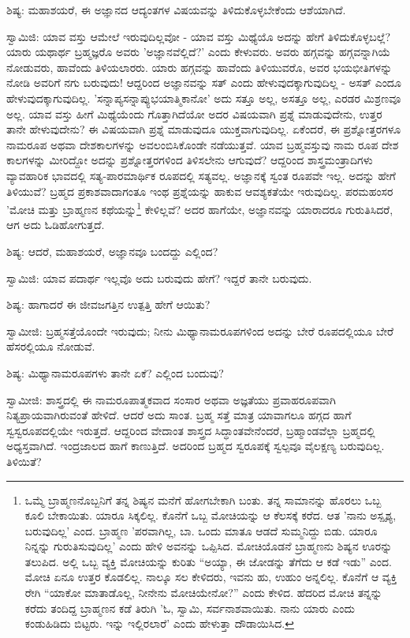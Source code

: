 ಶಿಷ್ಯ: ಮಹಾಶಯರೆ, ಈ ಅಜ್ಞಾನದ ಆದ್ಯಂತಗಳ ವಿಷಯವನ್ನು ತಿಳಿದುಕೊಳ್ಳಬೇಕೆಂದು ಆಶೆಯಾಗಿದೆ.

ಸ್ವಾಮಿಜಿ: ಯಾವ ವಸ್ತು ಆಮೇಲೆ ಇರುವುದಿಲ್ಲವೋ - ಯಾವ ವಸ್ತು ಮಿಥ್ಯೆಯೊ ಅದನ್ನು ಹೇಗೆ ತಿಳಿದುಕೊಳ್ಳಬಲ್ಲೆ? ಯಾರು ಯಥಾರ್ಥ ಬ್ರಹ್ಮಜ್ಞರೊ ಅವರು 'ಅಜ್ಞಾನವೆಲ್ಲಿದೆ?' ಎಂದು ಕೇಳುವರು. ಅವರು ಹಗ್ಗವನ್ನು ಹಗ್ಗವನ್ನಾಗಿಯೆ ನೋಡುವರು, ಹಾವೆಂದು ತಿಳಿಯಲಾರರು. ಯಾರು ಹಗ್ಗವನ್ನು ಹಾವೆಂದು ತಿಳಿಯುವರೊ, ಅವರ ಭಯಭೀತಿಗಳನ್ನು ನೋಡಿ ಅವರಿಗೆ ನಗು ಬರುವುದು! ಆದ್ದರಿಂದ ಅಜ್ಞಾನವನ್ನು ಸತ್ ಎಂದು ಹೇಳುವುದಕ್ಕಾಗುವುದಿಲ್ಲ - ಅಸತ್ ಎಂದೂ ಹೇಳುವುದಕ್ಕಾಗುವುದಿಲ್ಲ. 'ಸನ್ನಾಪ್ಯಸನ್ನಾಪ್ಯುಭಯಾತ್ಮಿಕಾನೋ' ಅದು ಸತ್ತೂ ಅಲ್ಲ, ಅಸತ್ತೂ ಅಲ್ಲ, ಎರಡರ ಮಿಶ್ರಣವೂ ಅಲ್ಲ. ಯಾವ ವಸ್ತು ಹೀಗೆ ಮಿಥ್ಯೆಯೆಂದು ಗೊತ್ತಾಗಿದೆಯೋ ಅದರ ವಿಷಯವಾಗಿ ಪ್ರಶ್ನೆ ಮಾಡುವುದೇನು, ಉತ್ತರ ತಾನೇ ಹೇಳುವುದೇನು? ಈ ವಿಷಯವಾಗಿ ಪ್ರಶ್ನೆ ಮಾಡುವುದೂ ಯುಕ್ತವಾಗುವುದಿಲ್ಲ. ಏಕೆಂದರೆ, ಈ ಪ್ರಶ್ನೋತ್ತರಗಳೂ ನಾಮರೂಪ ಅಥವಾ ದೇಶಕಾಲಗಳನ್ನು ಅವಲಂಬಿಸಿಕೊಂಡೇ ನಡೆಯುತ್ತವೆ. ಯಾವ ಬ್ರಹ್ಮವಸ್ತುವು ನಾಮ ರೂಪ ದೇಶ ಕಾಲಗಳನ್ನು ಮೀರಿದ್ದೋ ಅದನ್ನು ಪ್ರಶ್ನೋತ್ತರಗಳಿಂದ ತಿಳಿಸಲೇನು ಆಗುವುದೆ? ಆದ್ದರಿಂದ ಶಾಸ್ತ್ರಮಂತ್ರಾದಿಗಳು ವ್ಯಾವಹಾರಿಕ ಭಾವದಲ್ಲಿ ಸತ್ಯ-ಪಾರಮಾರ್ಥಿಕ ರೂಪದಲ್ಲಿ ಸತ್ಯವಲ್ಲ. ಅಜ್ಞಾನಕ್ಕೆ ಸ್ವಂತ ರೂಪವೇ ಇಲ್ಲ. ಅದನ್ನು ಹೇಗೆ ತಿಳಿಯುವೆ? ಬ್ರಹ್ಮದ ಪ್ರಕಾಶವಾದಾಗಂತೂ ಇಂಥ ಪ್ರಶ್ನೆಯನ್ನು ಹಾಕುವ ಆವಶ್ಯಕತೆಯೇ ಇರುವುದಿಲ್ಲ. ಪರಮಹಂಸರ 'ಮೋಚಿ ಮತ್ತು ಬ್ರಾಹ್ಮಣನ ಕಥೆಯನ್ನು\footnote{ಒಮ್ಮೆ ಬ್ರಾಹ್ಮಣನೊಬ್ಬನಿಗೆ ತನ್ನ ಶಿಷ್ಯನ ಮನೆಗೆ ಹೋಗಬೇಕಾಗಿ ಬಂತು. ತನ್ನ ಸಾಮಾನನ್ನು ಹೊರಲು ಒಬ್ಬ ಕೂಲಿ ಬೇಕಾಯಿತು. ಯಾರೂ ಸಿಕ್ಕಲಿಲ್ಲ. ಕೊನೆಗೆ ಒಬ್ಬ ಮೋಚಿಯನ್ನು ಆ ಕೆಲಸಕ್ಕೆ ಕರೆದ. ಆತ 'ನಾನು ಅಸ್ಪೃಶ್ಯ, ಬರುವುದಿಲ್ಲ' ಎಂದ. ಬ್ರಾಹ್ಮಣ 'ಪರವಾಗಿಲ್ಲ, ಬಾ. ಒಂದು ಮಾತೂ ಆಡದೆ ಸುಮ್ಮನಿದ್ದು ಬಿಡು. ಯಾರೂ ನಿನ್ನನ್ನು ಗುರುತಿಸುವುದಿಲ್ಲ' ಎಂದು ಹೇಳಿ ಅವನನ್ನು ಒಪ್ಪಿಸಿದ. ಮೋಚಿಯೊಡನೆ ಬ್ರಾಹ್ಮಣನು ಶಿಷ್ಯನ ಊರನ್ನು ತಲುಪಿದ. ಅಲ್ಲಿ ಒಬ್ಬ ವ್ಯಕ್ತಿ ಮೋಚಿಯನ್ನು ಕುರಿತು “ಅಯ್ಯಾ, ಈ ಜೋಡನ್ನು ತೆಗೆದು ಆ ಕಡೆ ಇಡು” ಎಂದ. ಮೋಚಿ ಏನೂ ಉತ್ತರ ಕೊಡಲಿಲ್ಲ. ನಾಲ್ಕೂ ಸಲ ಕೇಳಿದರು, ಇವನು ಹು, ಉಹುಂ ಅನ್ನಲಿಲ್ಲ. ಕೊನೆಗೆ ಆ ವ್ಯಕ್ತಿ ರೇಗಿ “ಯಾಕೋ ಮಾತಾಡೊಲ್ಲ, ನೀನೇನು ಮೋಚಿಯೇನೋ?” ಎಂದು ಕೇಳಿದ. ಹೆದರಿದ ಮೋಚಿ ತನ್ನನ್ನು ಕರೆದು ತಂದಿದ್ದ ಬ್ರಾಹ್ಮಣನ ಕಡೆ ತಿರುಗಿ 'ಓ, ಸ್ವಾಮಿ, ಸರ್ವನಾಶವಾಯಿತು. ನಾನು ಯಾರು ಎಂದು ಕಂಡುಹಿಡಿದು ಬಿಟ್ಟರು. ಇನ್ನು ಇಲ್ಲಿರಲಾರೆ' ಎಂದು ಹೇಳುತ್ತಾ ದೌಡಾಯಿಸಿದ.} ಕೇಳಿಲ್ಲವೆ? ಅದರ ಹಾಗೆಯೇ, ಅಜ್ಞಾನವನ್ನು ಯಾರಾದರೂ ಗುರುತಿಸಿದರೆ, ಆಗ ಅದು ಓಡಿಹೋಗುತ್ತದೆ.

ಶಿಷ್ಯ: ಆದರೆ, ಮಹಾಶಯರೆ, ಅಜ್ಞಾನವೂ ಬಂದದ್ದು ಎಲ್ಲಿಂದ?

ಸ್ವಾಮಿಜಿ: ಯಾವ ಪದಾರ್ಥ ಇಲ್ಲವೊ ಅದು ಬರುವುದು ಹೇಗೆ? ಇದ್ದರೆ ತಾನೇ ಬರುವುದು.

ಶಿಷ್ಯ: ಹಾಗಾದರೆ ಈ ಜೀವಜಗತ್ತಿನ ಉತ್ಪತ್ತಿ ಹೇಗೆ ಆಯಿತು?

ಸ್ವಾಮೀಜಿ: ಬ್ರಹ್ಮಸತ್ತೆಯೊಂದೇ ಇರುವುದು; ನೀನು ಮಿಥ್ಯಾನಾಮರೂಪಗಳಿಂದ ಅದನ್ನು ಬೇರೆ ರೂಪದಲ್ಲಿಯೂ ಬೇರೆ ಹೆಸರಲ್ಲಿಯೂ ನೋಡುವೆ.

ಶಿಷ್ಯ: ಮಿಥ್ಯಾನಾಮರೂಪಗಳು ತಾನೇ ಏಕೆ? ಎಲ್ಲಿಂದ ಬಂದುವು?

ಸ್ವಾಮೀಜಿ: ಶಾಸ್ತ್ರದಲ್ಲಿ ಈ ನಾಮರೂಪಾತ್ಮಕವಾದ ಸಂಸಾರ ಅಥವಾ ಅಜ್ಞತೆಯು ಪ್ರವಾಹರೂಪವಾಗಿ ನಿತ್ಯಪ್ರಾಯವಾಗಿರುವಂತೆ ಹೇಳಿದೆ. ಆದರೆ ಅದು ಸಾಂತ. ಬ್ರಹ್ಮ ಸತ್ತೆ ಮಾತ್ರ ಯಾವಾಗಲೂ ಹಗ್ಗದ ಹಾಗೆ ಸ್ವಸ್ವರೂಪದಲ್ಲಿಯೇ ಇರುತ್ತದೆ. ಆದ್ದರಿಂದ ವೇದಾಂತ ಶಾಸ್ತ್ರದ ಸಿದ್ಧಾಂತವೇನೆಂದರೆ, ಬ್ರಹ್ಮಾಂಡವೆಲ್ಲಾ ಬ್ರಹ್ಮದಲ್ಲಿ ಅಧ್ಯಸ್ತವಾಗಿದೆ. ಇಂದ್ರಜಾಲದ ಹಾಗೆ ಕಾಣುತ್ತಿದೆ. ಅದರಿಂದ ಬ್ರಹ್ಮದ ಸ್ವರೂಪಕ್ಕೆ ಸ್ವಲ್ಪವೂ ವೈಲಕ್ಷಣ್ಯ ಬರುವುದಿಲ್ಲ. ತಿಳಿಯಿತೆ?

